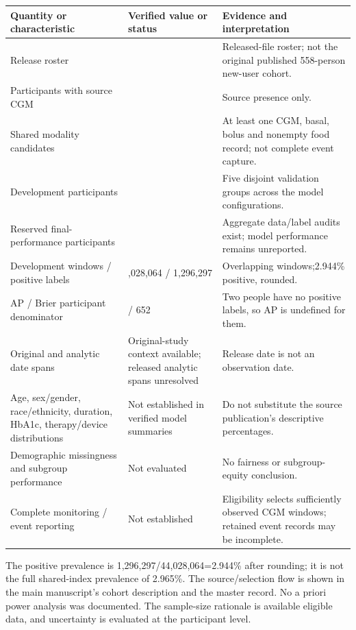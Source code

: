 \documentclass[11pt,a4paper]{article}
\begin{document}
{\small
\setlength{\tabcolsep}{3pt}
\begin{longtable}{>{\raggedright\arraybackslash}p{}>{\raggedright\arraybackslash}p{}>{\raggedright\arraybackslash}p{}}
\toprule
\textbf{Quantity or characteristic} & \textbf{Verified value or status} & \textbf{Evidence and interpretation} \\ \midrule
\endhead
Release roster & 919 & Released-file roster; not the original published 558-person new-user cohort. \\
Participants with source CGM & 851 & Source presence only. \\
Shared modality candidates & 835 & At least one CGM, basal, bolus and nonempty food record; not complete event capture. \\
Development participants & 652 & Five disjoint validation groups across the model configurations. \\
Reserved final-performance participants & 183 & Aggregate data/label audits exist; model performance remains unreported. \\
Development windows / positive labels & 44,028,064 / 1,296,297 & Overlapping windows;2.944\% positive, rounded. \\
AP / Brier participant denominator & 650 / 652 & Two people have no positive labels, so AP is undefined for them. \\
Original and analytic date spans & Original-study context available; released analytic spans unresolved & Release date is not an observation date. \\
Age, sex/gender, race/ethnicity, duration, HbA1c, therapy/device distributions & Not established in verified model summaries & Do not substitute the source publication's descriptive percentages. \\
Demographic missingness and subgroup performance & Not evaluated & No fairness or subgroup-equity conclusion. \\
Complete monitoring / event reporting & Not established & Eligibility selects sufficiently observed CGM windows; retained event records may be incomplete. \\
\bottomrule
\end{longtable}
}
The positive prevalence is 1,296,297/44,028,064=2.944\% after rounding; it is not the full shared-index prevalence of 2.965\%. The source/selection flow is shown in the main manuscript's cohort description and the master record. No a priori power analysis was documented. The sample-size rationale is available eligible data, and uncertainty is evaluated at the participant level.
\end{document}
